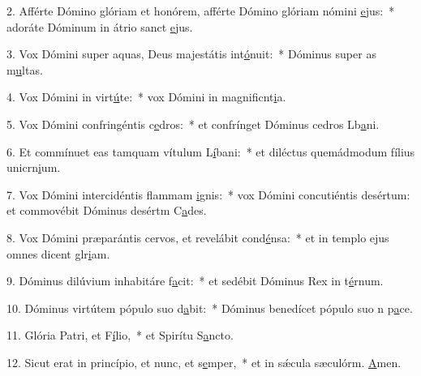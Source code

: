 2. Afférte Dómino glóriam et honórem, afférte Dómino glóriam nómini \uline{e}jus:~* adoráte Dóminum in átrio sanct \uline{e}jus.\par 
3. Vox Dómini super aquas, Deus majestátis int\uline{ó}nuit:~* Dóminus super as m\uline{u}ltas.\par 
4. Vox Dómini in virt\uline{ú}te:~* vox Dómini in magnificnt\uline{i}a.\par 
5. Vox Dómini confringéntis c\uline{e}dros:~* et confrínget Dóminus cedros Lb\uline{a}ni.\par 
6. Et commínuet eas tamquam vítulum L\uline{í}bani:~* et diléctus quemádmodum fílius unicrn\uline{i}um.\par 
7. Vox Dómini intercidéntis flammam \uline{i}gnis:~* vox Dómini concutiéntis desértum: et commovébit Dóminus desértm C\uline{a}des.\par 
8. Vox Dómini præparántis cervos, et revelábit cond\uline{é}nsa:~* et in templo ejus omnes dicent glr\uline{i}am.\par 
9. Dóminus dilúvium inhabitáre f\uline{a}cit:~* et sedébit Dóminus Rex in t\uline{é}rnum.\par 
10. Dóminus virtútem pópulo suo d\uline{a}bit:~* Dóminus benedícet pópulo suo n p\uline{a}ce.\par 
11. Glória Patri, et F\uline{í}lio,~* et Spirítu S\uline{a}ncto.\par 
12. Sicut erat in princípio, et nunc, et s\uline{e}mper,~* et in sǽcula sæculórm. \uline{A}men.\par 
